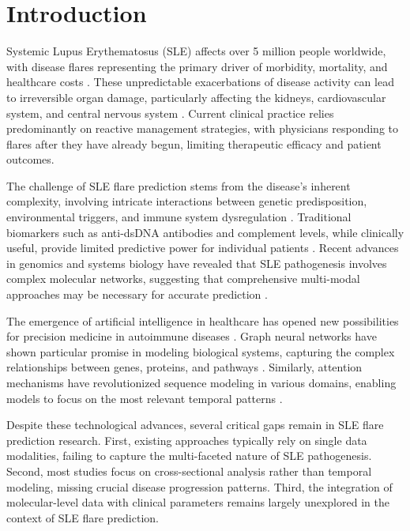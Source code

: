\documentclass[conference]{IEEEtran}
\begin{document}
\section{Introduction}

Systemic Lupus Erythematosus (SLE) affects over 5 million people worldwide, with disease flares representing the primary driver of morbidity, mortality, and healthcare costs \cite{tsokos2011systemic}. These unpredictable exacerbations of disease activity can lead to irreversible organ damage, particularly affecting the kidneys, cardiovascular system, and central nervous system \cite{bernatsky2006mortality}. Current clinical practice relies predominantly on reactive management strategies, with physicians responding to flares after they have already begun, limiting therapeutic efficacy and patient outcomes.

The challenge of SLE flare prediction stems from the disease's inherent complexity, involving intricate interactions between genetic predisposition, environmental triggers, and immune system dysregulation \cite{tsokos2016autoimmunity}. Traditional biomarkers such as anti-dsDNA antibodies and complement levels, while clinically useful, provide limited predictive power for individual patients \cite{petri2005derivation}. Recent advances in genomics and systems biology have revealed that SLE pathogenesis involves complex molecular networks, suggesting that comprehensive multi-modal approaches may be necessary for accurate prediction \cite{bentham2015genetic}.

The emergence of artificial intelligence in healthcare has opened new possibilities for precision medicine in autoimmune diseases \cite{rajkomar2018machine}. Graph neural networks have shown particular promise in modeling biological systems, capturing the complex relationships between genes, proteins, and pathways \cite{zitnik2018machine}. Similarly, attention mechanisms have revolutionized sequence modeling in various domains, enabling models to focus on the most relevant temporal patterns \cite{vaswani2017attention}.

Despite these technological advances, several critical gaps remain in SLE flare prediction research. First, existing approaches typically rely on single data modalities, failing to capture the multi-faceted nature of SLE pathogenesis. Second, most studies focus on cross-sectional analysis rather than temporal modeling, missing crucial disease progression patterns. Third, the integration of molecular-level data with clinical parameters remains largely unexplored in the context of SLE flare prediction.
\end{document}
